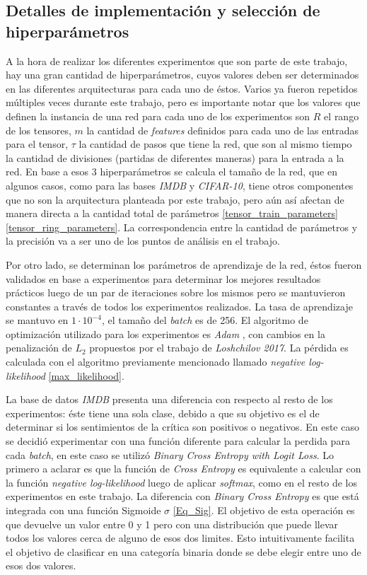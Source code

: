 \documentclass[spanish]{article}
\theoremstyle{definition}
\theoremstyle{remark}
\numberwithin{equation}{section}
\numberwithin{equation}{section} %
\begin{document}
\subsection{Detalles de implementación y selección de hiperparámetros}
A la hora de realizar los diferentes experimentos que son parte de este trabajo, hay una gran cantidad de hiperparámetros, cuyos valores deben ser determinados en las diferentes arquitecturas para cada uno de éstos. Varios ya fueron repetidos múltiples veces durante este trabajo, pero es importante notar que los valores que definen la instancia de una red para cada uno de los experimentos son $R$ el rango de los tensores, $m$ la cantidad de \textit{features} definidos para cada uno de las entradas para el tensor, $\tau$ la cantidad de pasos que tiene la red, que son al mismo tiempo la cantidad de divisiones (partidas de diferentes maneras) para la entrada a la red. En base a esos 3 hiperparámetros se calcula el tamaño de la red, que en algunos casos, como para las bases \textit{IMDB} y \textit{CIFAR-10}, tiene otros componentes que no son la arquitectura planteada por este trabajo, pero aún así afectan de manera directa a la cantidad total de parámetros \eqref{tensor_train_parameters} \eqref{tensor_ring_parameters}. La correspondencia entre la cantidad de parámetros y la precisión va a ser uno de los puntos de análisis en el trabajo. \par 
Por otro lado, se determinan los parámetros de aprendizaje de la red, éstos fueron validados en base a experimentos para determinar los mejores resultados prácticos luego de un par de iteraciones sobre los mismos pero se mantuvieron constantes a través de todos los experimentos realizados. La tasa de aprendizaje se mantuvo en $1 \cdot 10^{-4}$, el tamaño del \textit{batch} es de 256. El algoritmo de optimización utilizado para los experimentos es \textit{Adam} \cite{kingma2014adam}, con cambios en la penalización de $L_2$ propuestos por el trabajo de \textit{Loshchilov 2017}\cite{loshchilov2017decoupled}. La pérdida es calculada con el algoritmo previamente mencionado llamado \textit{negative log-likelihood} \eqref{max_likelihood}. \par
La base de datos \textit{IMDB} presenta una diferencia con respecto al resto de los experimentos: éste tiene una sola clase, debido a que su objetivo es el de determinar si los sentimientos de la crítica son positivos o negativos. En este caso se decidió experimentar con una función diferente para calcular la perdida para cada \textit{batch}, en este caso se utilizó \textit{Binary Cross Entropy with Logit Loss}. Lo primero a aclarar es que la función de \textit{Cross Entropy} es equivalente a calcular con la función \textit{negative log-likelihood} luego de aplicar \textit{softmax}, como en el resto de los experimentos en este trabajo. La diferencia con \textit{Binary Cross Entropy} es que está integrada con una función Sigmoide $\sigma$ \eqref{Eq_Sig}. El objetivo de esta operación es que devuelve un valor entre 0 y 1 pero con una distribución que puede llevar todos los valores cerca de alguno de esos dos limites. Esto intuitivamente facilita el objetivo de clasificar en una categoría binaria donde se debe elegir entre uno de esos dos valores.    
\end{document}
